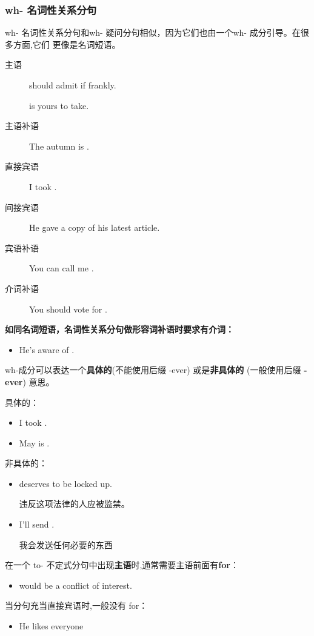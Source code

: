 \subsubsection{wh- 名词性关系分句}

wh- 名词性关系分句和wh- 疑问分句相似，因为它们也由一个wh- 成分引导。在很多方面,它们
更像是名词短语。
\begin{description}
\item[主语]  should admit if frankly.

   is yours to take.
\item[主语补语] The autumn is .
\item[直接宾语] I took .
\item[间接宾语] He gave  a copy of his latest article.
\item[宾语补语] You can call me .
\item[介词补语] You should vote for .
\end{description}

\textbf{如同名词短语，名词性关系分句做形容词补语时要求有介词：}
\begin{itemize}
\item He's aware of .
\end{itemize}

wh-成分可以表达一个\textbf{具体的}(不能使用后缀 -ever) 或是\textbf{非具体的}
(一般使用后缀 \textbf{-ever}) 意思。

具体的：
\begin{itemize}
\item I took .
\item May is .
\end{itemize}


非具体的：
\begin{itemize}
\item {} deserves to be locked up.

  违反这项法律的人应被监禁。
\item I'll send .

  我会发送任何必要的东西
\end{itemize}

在一个 to- 不定式分句中出现\textbf{主语}时,通常需要主语前面有\textbf{for}：
\begin{itemize}
\item {} would be a conflict of interest.
\end{itemize}
当分句充当直接宾语时,一般没有 for：
\begin{itemize}
\item He likes everyone 
\end{itemize}

